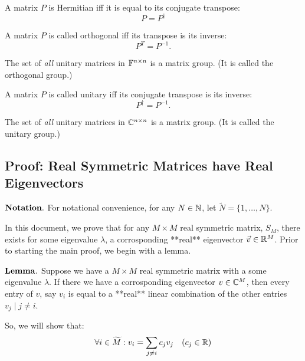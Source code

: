 \begin{definition}
A matrix $P$ is Hermitian iff it is equal to its conjugate transpose:
$$ P = P^{\dagger}$$
\end{definition}

\begin{definition}
A matrix $P$ is called orthogonal iff its transpose is its inverse:
$$ P^{T}=P^{-1}. $$
\end{definition}

\begin{theorem}
The set of {\em all} unitary matrices in $\mathbb{F}^{n\times n}$ is a matrix group. (It is called the {orthogonal group}.)
\end{theorem}

\begin{definition}
A matrix $P$ is called unitary iff its conjugate transpose is its inverse:
$$ P^{\dagger}=P^{-1}. $$
\end{definition}

\begin{theorem}
The set of {\em all} unitary matrices in $\mathbb{C}^{n\times n}$ is a matrix group. (It is called the {unitary group}.)
\end{theorem}


\newpage

\subsection{Proof: Real Symmetric Matrices have Real Eigenvectors}

$\bf Notation.$ For notational convenience, for any $N \in \mathbb{N}$, let $\widetilde{N} = \{1,\dots,N\}$.

In this document, we prove that for any $M \times M$ real symmetric matrix, $S_M$, there exists for some eigenvalue $\lambda$, a corrosponding **real** eigenvector $\vec{v} \in \mathbb{R}^M$. Prior to starting the main proof, we begin with a lemma.

$\bf Lemma.$ Suppose we have a $M \times M$ real symmetric matrix with a some eigenvalue $\lambda$. If there we have a corrosponding eigenvector $v \in \mathbb{C}^M$, then every entry of $v$, say $v_i$ is equal to a **real** linear combination of the other entries $v_j \mid j \neq i$.

So, we will show that:
$$\forall i \in \widetilde{M}: v_i =  {\sum_{j \neq i} c_j v_j} \quad (c_j \in \mathbb{R})$$

